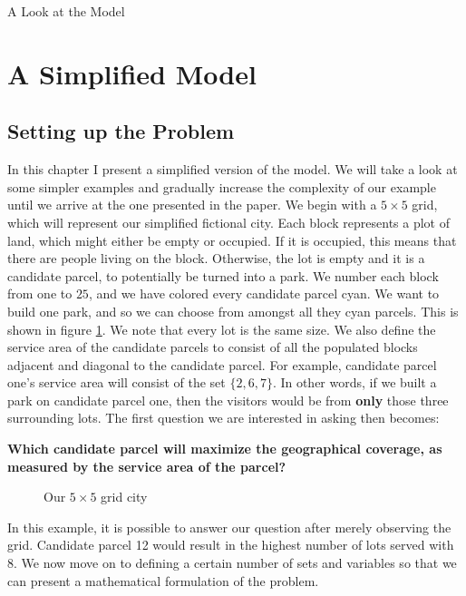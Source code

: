 \documentclass[12pt]{pom_thesis}
\begin{document}
\begin{chapter}{A Look at the Model}
\section{A Simplified Model}
\subsection{Setting up the Problem}

In this chapter I present a simplified version of the model. We will take a look at some simpler examples and gradually increase the complexity of our example until we arrive at the one presented in the paper. We begin with a $5\times5$ grid, which will represent our simplified fictional city. Each block represents a plot of land, which might either be empty or occupied. If it is occupied, this means that there are people living on the block. Otherwise, the lot is empty and it is a candidate parcel, to potentially be turned into a park. We number each block from one to $25$, and we have colored every candidate parcel cyan. We want to build one park, and so we can choose from amongst all they cyan parcels. This is shown in figure \ref{fig:grid1}. We note that every lot is the same size. We also define the service area of the candidate parcels to consist of all the populated blocks adjacent and diagonal to the candidate parcel. For example, candidate parcel one's service area will consist of the set $\{2,6,7\}$. In other words, if we built a park on candidate parcel one, then the visitors would be from \textbf{only} those three surrounding lots. The first question we are interested in asking then becomes: 
\begin{center}
\textbf{Which candidate parcel will maximize the geographical coverage, as measured by the service area of the parcel?}
\end{center}
\begin{figure}
 \caption{Our $5\times 5$ grid city}
 \centering
 \label{fig:grid1}
\end{figure}
In this example, it is possible to answer our question after merely observing the grid. Candidate parcel 12 would result in the highest number of lots served with 8. We now move on to defining a certain number of sets and variables so that we can present a mathematical formulation of the problem. \newline 
	

\end{chapter}
\end{document}
